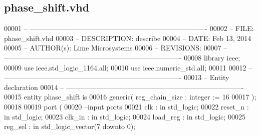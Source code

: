 \subsection{phase\+\_\+shift.\+vhd}
\label{phase__shift_8vhd_source}

\begin{DoxyCode}
00001 \textcolor{keyword}{-- ---------------------------------------------------------------------------- }
00002 \textcolor{keyword}{-- FILE:    phase\_shift.vhd}
00003 \textcolor{keyword}{-- DESCRIPTION: describe}
00004 \textcolor{keyword}{-- DATE:    Feb 13, 2014}
00005 \textcolor{keyword}{-- AUTHOR(s):   Lime Microsystems}
00006 \textcolor{keyword}{-- REVISIONS:}
00007 \textcolor{keyword}{-- ---------------------------------------------------------------------------- }
00008 \textcolor{vhdlkeyword}{library }\textcolor{keywordflow}{ieee};
00009 \textcolor{vhdlkeyword}{use }ieee.std\_logic\_1164.\textcolor{keywordflow}{all};
00010 \textcolor{vhdlkeyword}{use }ieee.numeric\_std.\textcolor{keywordflow}{all};
00011 
00012 \textcolor{keyword}{-- ----------------------------------------------------------------------------}
00013 \textcolor{keyword}{-- Entity declaration}
00014 \textcolor{keyword}{-- ----------------------------------------------------------------------------}
00015 \textcolor{keywordflow}{entity }phase_shift \textcolor{keywordflow}{is}
00016     \textcolor{keywordflow}{generic}\textcolor{vhdlchar}{(} \textcolor{vhdlchar}{reg_chain_size} \textcolor{vhdlchar}{:} \textcolor{comment}{integer} \textcolor{vhdlchar}{:=} \textcolor{vhdllogic}{}\textcolor{vhdllogic}{16}
00017                 \textcolor{vhdlchar}{)};
00018 
00019   \textcolor{keywordflow}{port} \textcolor{vhdlchar}{(}
00020 \textcolor{keyword}{        --input ports }
00021         \textcolor{vhdlchar}{clk}       \textcolor{vhdlchar}{:} \textcolor{keywordflow}{in} \textcolor{comment}{std\_logic};
00022         \textcolor{vhdlchar}{reset_n}   \textcolor{vhdlchar}{:} \textcolor{keywordflow}{in} \textcolor{comment}{std\_logic};
00023           \textcolor{vhdlchar}{clk_in}        \textcolor{vhdlchar}{:} \textcolor{keywordflow}{in} \textcolor{comment}{std\_logic};
00024           \textcolor{vhdlchar}{load_reg}  \textcolor{vhdlchar}{:} \textcolor{keywordflow}{in} \textcolor{comment}{std\_logic};
00025           reg\_sel   : \textcolor{keywordflow}{in} \textcolor{comment}{std\_logic\_vector}(\textcolor{vhdllogic}{7} \textcolor{keywordflow}{downto} \textcolor{vhdllogic}{0});

\end{DoxyCode}
